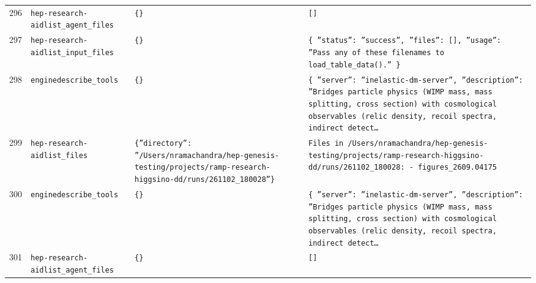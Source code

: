 \documentclass[11pt,a4paper]{article}
\begin{document}
\begin{longtable}{@{}p{}p{}p{}p{}@{}}
296 & \texttt{hep-research-aid}\newline\texttt{list\_\allowbreak{}agent\_\allowbreak{}files} & \texttt{\{\}\allowbreak{}} & \texttt{[]\allowbreak{}} \\
297 & \texttt{hep-research-aid}\newline\texttt{list\_\allowbreak{}input\_\allowbreak{}files} & \texttt{\{\}\allowbreak{}} & \texttt{\{   ''status'':\allowbreak{} ''success'',\allowbreak{}   ''files'':\allowbreak{} []\allowbreak{},\allowbreak{}   ''usage'':\allowbreak{} ''Pass any of these filenames to load\_\allowbreak{}table\_\allowbreak{}data()\allowbreak{}.'' \}\allowbreak{}} \\
298 & \texttt{engine}\newline\texttt{describe\_\allowbreak{}tools} & \texttt{\{\}\allowbreak{}} & \texttt{\{   ''server'':\allowbreak{} ''inelastic-dm-server'',\allowbreak{}   ''description'':\allowbreak{} ''Bridges particle physics (WIMP mass,\allowbreak{} mass splitting,\allowbreak{} cross section)\allowbreak{} with cosmological observables (relic density,\allowbreak{} recoil spectra,\allowbreak{} indirect detect\ldots{}\allowbreak{}} \\
299 & \texttt{hep-research-aid}\newline\texttt{list\_\allowbreak{}files} & \texttt{\{''directory'':\allowbreak{} ''/\allowbreak{}Users/\allowbreak{}nramachandra/\allowbreak{}hep-genesis-testing/\allowbreak{}projects/\allowbreak{}ramp-research-higgsino-dd/\allowbreak{}runs/\allowbreak{}261102\_\allowbreak{}180028''\}\allowbreak{}} & \texttt{Files in /\allowbreak{}Users/\allowbreak{}nramachandra/\allowbreak{}hep-genesis-testing/\allowbreak{}projects/\allowbreak{}ramp-research-higgsino-dd/\allowbreak{}runs/\allowbreak{}261102\_\allowbreak{}180028:\allowbreak{}   - figures\_\allowbreak{}2609.04175} \\
300 & \texttt{engine}\newline\texttt{describe\_\allowbreak{}tools} & \texttt{\{\}\allowbreak{}} & \texttt{\{   ''server'':\allowbreak{} ''inelastic-dm-server'',\allowbreak{}   ''description'':\allowbreak{} ''Bridges particle physics (WIMP mass,\allowbreak{} mass splitting,\allowbreak{} cross section)\allowbreak{} with cosmological observables (relic density,\allowbreak{} recoil spectra,\allowbreak{} indirect detect\ldots{}\allowbreak{}} \\
301 & \texttt{hep-research-aid}\newline\texttt{list\_\allowbreak{}agent\_\allowbreak{}files} & \texttt{\{\}\allowbreak{}} & \texttt{[]\allowbreak{}} \\

\end{longtable}
\end{document}
